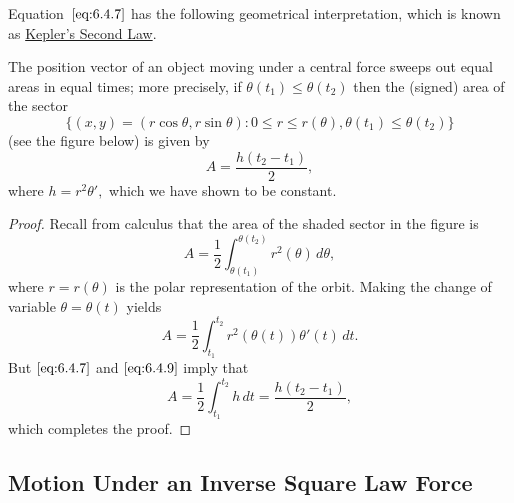 \documentclass{ximera}
\begin{document}
Equation~$\eqref{eq:6.4.7}$ has the following geometrical interpretation, which
is known as
\href{https://en.wikipedia.org/wiki/Kepler%27s_laws_of_planetary_motion#Second_law}{Kepler's Second Law}.

\begin{theorem}\label{thmtype:6.4.1}
 The position vector
 of an object moving under a central force
sweeps out equal areas in equal times; more precisely, if
$\theta(t_1)\leq\theta(t_2)$ then the (signed) area of the sector
$$
\{(x,y)=(r\cos\theta,r\sin\theta)  :  0\leq r\leq r(\theta),
\theta(t_1)\leq\theta(t_2)\}
$$
(see the figure below) is given by
$$
A=\frac{h(t_2-t_1)}{2},
$$
where $h=r^2\theta',$ which we have shown to be constant.
\end{theorem}

\begin{center}
\end{center}


\begin{proof}  Recall from calculus that the area of the shaded sector
in the figure is
$$
A=\frac{1}{2}\int_{\theta(t_1)}^{\theta(t_2)} r^2(\theta)\,d\theta,
$$
where $r=r(\theta)$ is the polar representation of the orbit.
Making the change of variable $\theta=\theta(t)$ yields
\begin{equation} \label{eq:6.4.9}
A=\frac{1}{2}\int_{t_1}^{t_2} r^2(\theta(t))\theta'(t)\,dt.
\end{equation}
But $\eqref{eq:6.4.7}$ and $\eqref{eq:6.4.9}$ imply that
$$
A=\frac{1}{2}\int_{t_1}^{t_2} h\,dt=\frac{h(t_2-t_1)}{2},
$$
which completes the proof.
\end{proof}

\subsection*{Motion Under an Inverse Square Law Force}
\end{document}
